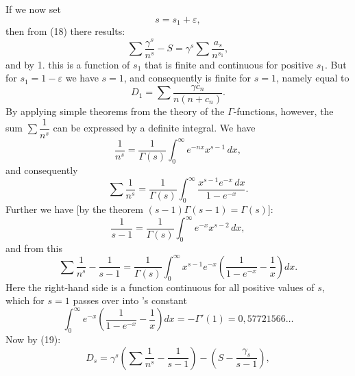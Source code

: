 If we now set
\[
s = s_1 + \varepsilon,
\]
then from (18) there results:
\[
\sum \frac{\gamma^s}{n^s} - S = \gamma^s \sum \frac{a_s}{n^{s_1}},
\]
and by 1. this is a function of $s_1$ that is finite and continuous for positive $s_1$. But for $s_1 = 1-\varepsilon$ we have $s=1$, and consequently
is finite for $s=1$, namely equal to
\[
D_1 = \sum \frac{\gamma c_n}{n(n+c_n)}.
\]
By applying simple theorems from the theory of the $\Gamma$-functions, however, the sum $\sum \dfrac{1}{n^s}$ can be expressed by a definite integral. We have
\[
\frac{1}{n^s} = \frac{1}{\Gamma(s)}\int_0^{\infty} e^{-nx} x^{s-1}\, dx,
\]
and consequently
\[
\sum \frac{1}{n^s} = \frac{1}{\Gamma(s)}\int_0^{\infty} \frac{x^{s-1}e^{-x}\,dx}{1-e^{-x}}.
\]
Further we have [by the theorem $(s-1)\Gamma(s-1) = \Gamma(s)$]:
\[
\frac{1}{s-1} = \frac{1}{\Gamma(s)}\int_0^{\infty} e^{-x} x^{s-2}\, dx,
\]
and from this
\[
\sum \frac{1}{n^s} - \frac{1}{s-1} = \frac{1}{\Gamma(s)}\int_0^{\infty} x^{s-1}e^{-x}\left(\frac{1}{1-e^{-x}} - \frac{1}{x}\right)dx.
\]
Here the right-hand side is a function continuous for all positive values of $s$, which for $s=1$ passes over into 's constant
\[
\int_0^{\infty} e^{-x}\left(\frac{1}{1-e^{-x}} - \frac{1}{x}\right)dx = -\Gamma'(1) = 0{,}57721566\ldots
\]
Now by (19):
\[
D_s = \gamma^s\left(\sum \frac{1}{n^s} - \frac{1}{s-1}\right) - \left(S - \frac{\gamma_s}{s-1}\right),
\]
